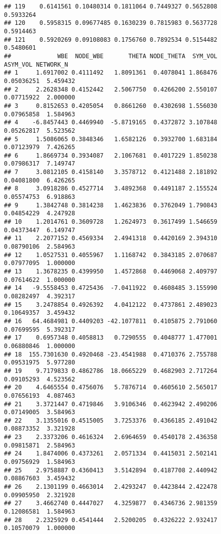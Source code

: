 \documentclass[]{article}
\begin{document}
\begin{verbatim}
## 119    0.6141561 0.10480314 0.1811064 0.7449327 0.5652808    0.5933264
## 120    0.5958315 0.09677485 0.1630239 0.7815983 0.5637728    0.5914463
## 121    0.5920269 0.09108083 0.1756760 0.7892534 0.5154482    0.5480601
##             WBE  NODE_WBE       THETA NODE_THETA  SYM_VOL   ASYM_VOL NETWORK_N
## 1     1.6917002 0.4111492   1.8091361  0.4078041 1.868476 0.05036251  5.459432
## 2     2.2628348 0.4152442   2.5067750  0.4266200 2.550107 0.07715922  2.000000
## 3     0.8152653 0.4205054   0.8661260  0.4302698 1.556030 0.07965858  1.584963
## 4    -6.8457443 0.4469940  -5.8719165  0.4372872 3.107848 0.05262817  5.523562
## 5     1.5086065 0.3848346   1.6582126  0.3932700 1.683184 0.07123979  7.426265
## 6     1.8669734 0.3934087   2.1067681  0.4017229 1.850238 0.07986317  7.149747
## 7     3.0812105 0.4158140   3.3578712  0.4121488 2.181892 0.04081800  6.426265
## 8     3.0918286 0.4527714   3.4892368  0.4491187 2.155524 0.05574753  6.918863
## 9     1.3842748 0.3814238   1.4623836  0.3762049 1.790843 0.04854229  4.247928
## 10    1.2014761 0.3609728   1.2624973  0.3617499 1.546659 0.04373447  6.149747
## 11    2.2077152 0.4569334   2.4941318  0.4420169 2.394310 0.08790106  2.584963
## 12    1.0527531 0.4055967   1.1168742  0.3843185 2.070687 0.07977095  1.000000
## 13    1.3678235 0.4399950   1.4572868  0.4469068 2.409797 0.07614622  1.000000
## 14   -9.5558453 0.4725436  -7.0411922  0.4608485 3.155990 0.08282497  4.392317
## 15    3.2478854 0.4926392   4.0412122  0.4737861 2.489023 0.10649357  3.459432
## 16   64.4684981 0.4409203 -42.1077811  0.4105875 2.791060 0.07699595  5.392317
## 17    0.6957348 0.4058813   0.7290555  0.4048777 1.477001 0.06880846  1.000000
## 18  155.7301630 0.4920468 -23.4541988  0.4710376 2.755788 0.09531975  5.977280
## 19    9.7179833 0.4862786  18.0665229  0.4682903 2.717264 0.09105293  4.523562
## 20    4.6465554 0.4756076   5.7876714  0.4605610 2.565017 0.07656193  4.087463
## 21    3.3721447 0.4719846   3.9106346  0.4623942 2.490206 0.07149005  3.584963
## 22    3.1355016 0.4515005   3.7253376  0.4366185 2.491042 0.08873352  3.321928
## 23    2.3373206 0.4616324   2.6964659  0.4540178 2.436358 0.09815871  2.584963
## 24    1.8474006 0.4373261   2.0571334  0.4415031 2.502141 0.09756929  1.584963
## 25    2.9758887 0.4360413   3.5142894  0.4187708 2.440942 0.08867603  3.459432
## 26    2.1301199 0.4663014   2.4293247  0.4423844 2.422478 0.09905950  2.321928
## 27    3.4662740 0.4447027   4.3259877  0.4346736 2.981359 0.12086581  1.584963
## 28    2.2325929 0.4541444   2.5200205  0.4326222 2.932417 0.10570079  1.000000

\end{verbatim}
\end{document}
